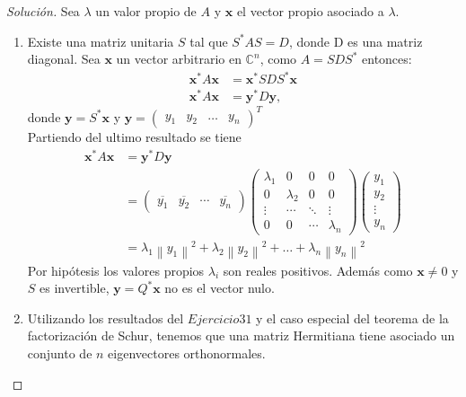 \documentclass[12pt]{book}
\newcommand{\C}{\mathbb{C}}
\newcommand\norm[1]{\left\lVert#1\right\rVert}
\newenvironment{solucion}
  {\renewcommand\qedsymbol{$\square$}\begin{proof}[Solución]}
  {\end{proof}}
\begin{document}
\begin{solucion}
Sea $\lambda$ un valor propio de $A$ y $\bm{x}$ el vector propio asociado a $\lambda$.
\renewcommand{\labelenumi}{(\alph{enumi})}
\begin{enumerate}
    \item Existe una matriz unitaria $S$ tal que $S^*AS=D$, donde D es una matriz diagonal. Sea $\bm{x}$ un vector arbitrario en $\C^n$, como $A=SDS^*$ entonces:
        \begin{align*}
            \bm{x}^*A\bm{x}&=\bm{x}^*SDS^*\bm{x}\\
            \bm{x}^*A\bm{x}&=\bm{y}^*D\bm{y},
        \end{align*}
        donde $\bm{y}=S^*\bm{x}$ y $\bm{y}=\begin{pmatrix} y_1& y_2& \dots& y_n\end{pmatrix}^T$ \\
        Partiendo del ultimo resultado se tiene
        \begin{align*}
            \bm{x}^*A\bm{x}&=\bm{y}^*D\bm{y}\\
            &=\begin{pmatrix}
            \overline{y_1}&\overline{y_2}&\cdots&\overline{y_n}
            \end{pmatrix}\begin{pmatrix}
            \lambda_1&0&0&0\\
            0&\lambda_2&0&0\\
            \vdots&\cdots&\ddots&\vdots\\
            0&0&\cdots&\lambda_n
            \end{pmatrix}\begin{pmatrix}
            y_1\\
            y_2\\
            \vdots\\
            y_n
           \end{pmatrix}\\
           &=\lambda_1\norm{y_1}^2+\lambda_2\norm{y_2}^2+\dots+\lambda_n\norm{y_n}^2
        \end{align*}
        Por hipótesis los valores propios $\lambda_i$ son reales positivos. Además como $\bm{x}\neq0$ y $S$ es invertible, $\bm{y}=Q^*\bm{x}$ no es el vector nulo. 
    \item Utilizando los resultados del $Ejercicio 31$ y el caso especial del teorema de la factorización de Schur, tenemos que una matriz Hermitiana tiene asociado un conjunto de $n$ eigenvectores orthonormales. 

\end{enumerate}
\end{solucion}
\end{document}
